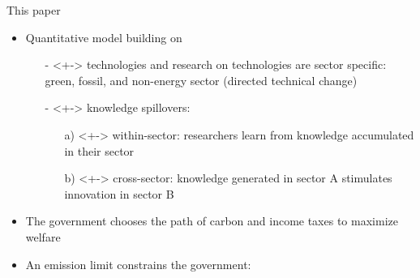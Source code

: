 \documentclass[11pt,aspectratio=169]{beamer}
\begin{document}
\begin{frame}{This paper}
	\vspace{-2mm}
	\begin{itemize}
		\item<+-> Quantitative model building on \cite{Fried2018ClimateAnalysis} 
		\vspace{2mm}
		\begin{itemize}
			\item[-]<+-> \alert{technologies and research on technologies are sector specific}: green, fossil, and non-energy sector \footnotesize{(directed technical change) }
			\vspace{1mm}
			\item[-]<+-> \alert{knowledge spillovers}: 
			\begin{enumerate}
				\item[a)]<+-> \alert{within-sector}: researchers learn from knowledge accumulated in their sector
				\item[b)]<+-> \alert{cross-sector}: knowledge generated in sector A stimulates innovation in sector B
			\end{enumerate}%
		\end{itemize}
		\vspace{2mm}
		\item<+->   The government   chooses the \alert{path of carbon and income taxes} to maximize welfare\vspace{2mm}
		\item<+-> An \alert{emission limit} constrains the government: 
	\end{itemize}
	\pause
	\vspace{0mm}
	\centering
\end{frame}
\end{document}
